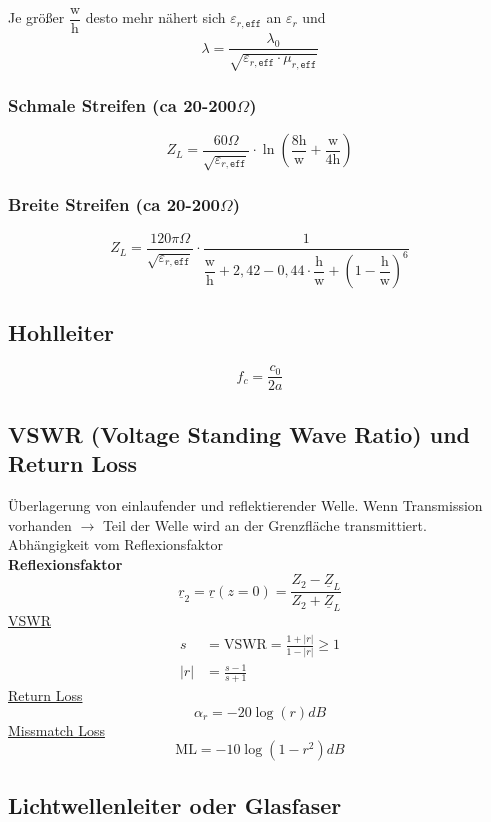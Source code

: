 Je größer $\dfrac{\mathrm{w}}{\mathrm{h}}$ desto mehr nähert sich $\varepsilon_{r,\texttt{eff}}$ an $\varepsilon_r$ und 
\[
    \lambda = \frac{\lambda_0}{\sqrt{\varepsilon_{r,\texttt{eff}}\cdot\mu_{r,\texttt{eff}}}}
\]

\subsubsection[Schmale Streifen]{Schmale Streifen (ca 20-200$\Omega$)}
\[
    Z_L = \frac{60\Omega}{\sqrt{\varepsilon_{r,\texttt{eff}}}}\cdot\ln\left(\frac{8\mathrm{h}}{\mathrm{w}}+\frac{\mathrm{w}}{4\mathrm{h}}\right)
\]
\subsubsection[Breite Streifen]{Breite Streifen (ca 20-200$\Omega$)}
\[
    Z_L = \frac{120\pi\Omega}{\sqrt{\varepsilon_{r,\texttt{eff}}}}\cdot\frac{1}{\dfrac{\mathrm{w}}{\mathrm{h}}+2,42-0,44\cdot\dfrac{\mathrm{h}}{\mathrm{w}}+\left(1-\dfrac{\mathrm{h}}{\mathrm{w}}\right)^6}
\]

\subsection{Hohlleiter}
\[
    f_c = \frac{c_0}{2a}
\]

\subsection{VSWR (Voltage Standing Wave Ratio) und Return Loss}\label{sec:VSWR}

Überlagerung von einlaufender und reflektierender Welle. Wenn Transmission vorhanden $\rightarrow$ Teil der Welle wird an der Grenzfläche transmittiert. Abhängigkeit vom Reflexionsfaktor\\

\textbf{Reflexionsfaktor}\\
          \[ \underline{r}_2 = \underline{r}(z=0) = \frac{Z_2 - \underline{Z}_L}{Z_2 + \underline{Z}_L} \]
\underline{VSWR}
\begin{align*}
    s   & = \mathrm{VSWR} = \frac{1+|r|}{1-|r|}\geq 1 \\
    |r| & = \frac{s-1}{s+1}
\end{align*}
\underline{Return Loss}
\[
    \alpha_r = -20\log(r)dB
\]
\underline{Missmatch Loss}
\[
    \mathrm{ML} = -10\log(1-r^2)dB
\]
\subsection{Lichtwellenleiter oder Glasfaser}

